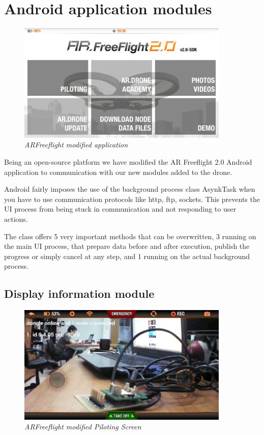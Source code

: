 \section{Android application modules}

\begin{figure}[ht]
\begin{center}
\includegraphics[width=0.9\textwidth]{implementation/android_app.png}
\end{center}
\caption{\small \itshape{ARFreeflight modified application}}
\end{figure}

Being an open-source platform we have modified the AR Freeflight 2.0 Android application to communication with our new modules added to the drone.

Android fairly imposes the use of the background process class AsynkTask when you have to use communication protocols like http, ftp, sockets. This prevents the UI process from being stuck in communication and not responding to user actions.

The class offers 5 very important methods that can be overwritten, 3 running on the main UI process, that prepare data before and after execution, publish the progress or simply cancel at any step, and 1 running on the actual background process.


\subsection{Display information module}

\begin{figure}[ht]
\begin{center}
\includegraphics[width=0.9\textwidth]{implementation/android_info.png}
\end{center}
\caption{\small \itshape{ARFreeflight modified Piloting Screen}}
\end{figure}

